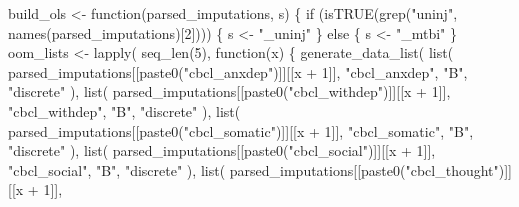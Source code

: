 \documentclass[
  letterpaper,
  DIV=11,
  numbers=noendperiod]{scrreprt}
\newenvironment{Shaded}{\begin{snugshade}}{\end{snugshade}}
\newcommand{\ControlFlowTok}[1]{\textcolor[rgb]{0.00,0.23,0.31}{#1}}
\newcommand{\DecValTok}[1]{\textcolor[rgb]{0.68,0.00,0.00}{#1}}
\newcommand{\FunctionTok}[1]{\textcolor[rgb]{0.28,0.35,0.67}{#1}}
\newcommand{\NormalTok}[1]{\textcolor[rgb]{0.00,0.23,0.31}{#1}}
\newcommand{\OtherTok}[1]{\textcolor[rgb]{0.00,0.23,0.31}{#1}}
\newcommand{\SpecialCharTok}[1]{\textcolor[rgb]{0.37,0.37,0.37}{#1}}
\newcommand{\StringTok}[1]{\textcolor[rgb]{0.13,0.47,0.30}{#1}}
\begin{document}
\begin{Shaded}
\begin{Highlighting}[]
\NormalTok{build\_ols }\OtherTok{\textless{}{-}} \ControlFlowTok{function}\NormalTok{(parsed\_imputations, s) \{}
    \ControlFlowTok{if}\NormalTok{ (}\FunctionTok{isTRUE}\NormalTok{(}\FunctionTok{grep}\NormalTok{(}\StringTok{"uninj"}\NormalTok{, }\FunctionTok{names}\NormalTok{(parsed\_imputations)[}\DecValTok{2}\NormalTok{]))) \{}
\NormalTok{        s }\OtherTok{\textless{}{-}} \StringTok{"\_uninj"}
\NormalTok{    \} }\ControlFlowTok{else}\NormalTok{ \{}
\NormalTok{        s }\OtherTok{\textless{}{-}} \StringTok{"\_mtbi"}
\NormalTok{    \}}
\NormalTok{    oom\_lists }\OtherTok{\textless{}{-}} \FunctionTok{lapply}\NormalTok{(}
        \FunctionTok{seq\_len}\NormalTok{(}\DecValTok{5}\NormalTok{),}
        \ControlFlowTok{function}\NormalTok{(x) \{}
            \FunctionTok{generate\_data\_list}\NormalTok{(}
                \FunctionTok{list}\NormalTok{(}
\NormalTok{                    parsed\_imputations[[}\FunctionTok{paste0}\NormalTok{(}\StringTok{"cbcl\_anxdep"}\NormalTok{)]][[x }\SpecialCharTok{+} \DecValTok{1}\NormalTok{]],}
                    \StringTok{"cbcl\_anxdep"}\NormalTok{,}
                    \StringTok{"B"}\NormalTok{,}
                    \StringTok{"discrete"}
\NormalTok{                ),}
                \FunctionTok{list}\NormalTok{(}
\NormalTok{                    parsed\_imputations[[}\FunctionTok{paste0}\NormalTok{(}\StringTok{"cbcl\_withdep"}\NormalTok{)]][[x }\SpecialCharTok{+} \DecValTok{1}\NormalTok{]],}
                    \StringTok{"cbcl\_withdep"}\NormalTok{,}
                    \StringTok{"B"}\NormalTok{,}
                    \StringTok{"discrete"}
\NormalTok{                ),}
                \FunctionTok{list}\NormalTok{(}
\NormalTok{                    parsed\_imputations[[}\FunctionTok{paste0}\NormalTok{(}\StringTok{"cbcl\_somatic"}\NormalTok{)]][[x }\SpecialCharTok{+} \DecValTok{1}\NormalTok{]],}
                    \StringTok{"cbcl\_somatic"}\NormalTok{,}
                    \StringTok{"B"}\NormalTok{,}
                    \StringTok{"discrete"}
\NormalTok{                ),}
                \FunctionTok{list}\NormalTok{(}
\NormalTok{                    parsed\_imputations[[}\FunctionTok{paste0}\NormalTok{(}\StringTok{"cbcl\_social"}\NormalTok{)]][[x }\SpecialCharTok{+} \DecValTok{1}\NormalTok{]],}
                    \StringTok{"cbcl\_social"}\NormalTok{,}
                    \StringTok{"B"}\NormalTok{,}
                    \StringTok{"discrete"}
\NormalTok{                ),}
                \FunctionTok{list}\NormalTok{(}
\NormalTok{                    parsed\_imputations[[}\FunctionTok{paste0}\NormalTok{(}\StringTok{"cbcl\_thought"}\NormalTok{)]][[x }\SpecialCharTok{+} \DecValTok{1}\NormalTok{]],}

\end{Highlighting}
\end{Shaded}
\end{document}
